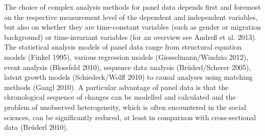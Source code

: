 \documentclass[letterpaper,10pt,openany,onesideH,english]{sphinxmanual}
\begin{document}
The choice of complex analysis methods for panel data depends first and foremost on the respective measurement level of the dependent and independent variables, but also on whether they are time-constant variables (such as gender or migration background) or time-invariant variables (for an overview see Andreß et al. 2013). The statistical analysis models of panel data range from structural equation models (Finkel 1995), various regression models (Giesselmann/Windzio 2012), event analysis (Blossfeld 2010), sequence data analysis (Brüderl/Scherer 2005), latent growth models (Schiedeck/Wolff 2010) to causal analyses using matching methods (Gangl 2010). A particular advantage of panel data is that the chronological sequence of changes can be modelled and calculated and the problem of unobserved heterogeneity, which is often encountered in the social sciences, can be significantly reduced, at least in comparison with cross-sectional data (Brüderl 2010).
\end{document}
